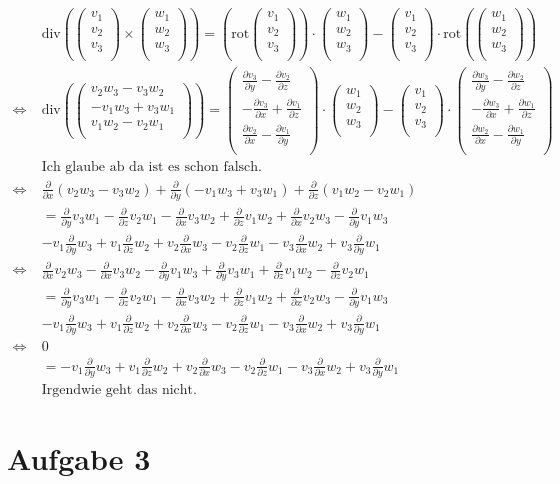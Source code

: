 \documentclass[10pt,a4paper,parskip=half]{scrartcl}
\newcommand{\vecthree}[3]{\begin{pmatrix}#1\\#2\\#3\\\end {pmatrix}}
\begin{document}
\begin{align*}
&\text{div}\left(\vecthree{v_1}{v_2}{v_3} \times \vecthree{w_1}{w_2}{w_3}\right) = \left( \text{rot} \vecthree{v_1}{v_2}{v_3} \right) \cdot \vecthree{w_1}{w_2}{w_3} - \vecthree{v_1}{v_2}{v_3} \cdot \text{rot}\left( \vecthree{w_1}{w_2}{w_3} \right) \\
\Leftrightarrow\; &\text{div}\left(\vecthree{v_2w_3 - v_3w_2}{-v_1w_3 + v_3w_1}{v_1w_2 - v_2w_1}\right) = \vecthree{\frac{\partial v_3}{\partial y} - \frac{\partial v_2}{\partial z}}{- \frac{\partial v_3}{\partial x} + \frac{\partial v_1}{\partial z}}{\frac{\partial v_2}{\partial x} - \frac{\partial v_1}{\partial y}} \cdot \vecthree{w_1}{w_2}{w_3} - \vecthree{v_1}{v_2}{v_3} \cdot \vecthree{\frac{\partial w_3}{\partial y} - \frac{\partial w_2}{\partial z}}{- \frac{\partial w_3}{\partial x} + \frac{\partial w_1}{\partial z}}{\frac{\partial w_2}{\partial x} - \frac{\partial w_1}{\partial y}} \\
&\text{Ich glaube ab da ist es schon falsch.}\\
\Leftrightarrow\; &\frac{\partial }{\partial x}(v_2w_3 - v_3w_2) + \frac{\partial }{\partial y}(-v_1w_3 + v_3w_1) + \frac{\partial }{\partial z}(v_1w_2 - v_2w_1)\\
&= \frac{\partial }{\partial y}v_3w_1 - \frac{\partial }{\partial z}v_2w_1 - \frac{\partial }{\partial x}v_3w_2 + \frac{\partial }{\partial z}v_1w_2 + \frac{\partial }{\partial x}v_2w_3 - \frac{\partial }{\partial y}v_1w_3\\
 &- v_1\frac{\partial }{\partial y}w_3 + v_1\frac{\partial }{\partial z}w_2 + v_2\frac{\partial }{\partial x}w_3 - v_2\frac{\partial }{\partial z}w_1 - v_3\frac{\partial }{\partial x}w_2 + v_3\frac{\partial }{\partial y}w_1\\
\Leftrightarrow\; &\frac{\partial }{\partial x}v_2w_3 - \frac{\partial }{\partial x}v_3w_2 - \frac{\partial }{\partial y}v_1w_3 + \frac{\partial }{\partial y}v_3w_1 + \frac{\partial }{\partial z}v_1w_2 - \frac{\partial }{\partial z}v_2w_1\\
&= \frac{\partial }{\partial y}v_3w_1 - \frac{\partial }{\partial z}v_2w_1 - \frac{\partial }{\partial x}v_3w_2 + \frac{\partial }{\partial z}v_1w_2 + \frac{\partial }{\partial x}v_2w_3 - \frac{\partial }{\partial y}v_1w_3\\
 &- v_1\frac{\partial }{\partial y}w_3 + v_1\frac{\partial }{\partial z}w_2 + v_2\frac{\partial }{\partial x}w_3 - v_2\frac{\partial }{\partial z}w_1 - v_3\frac{\partial }{\partial x}w_2 + v_3\frac{\partial }{\partial y}w_1\\
\Leftrightarrow\; & 0\\
&= - v_1\frac{\partial }{\partial y}w_3 + v_1\frac{\partial }{\partial z}w_2 + v_2\frac{\partial }{\partial x}w_3 - v_2\frac{\partial }{\partial z}w_1 - v_3\frac{\partial }{\partial x}w_2 + v_3\frac{\partial }{\partial y}w_1\\
&\text{Irgendwie geht das nicht.}
\end{align*}
\section*{Aufgabe 3}
\end{document}
